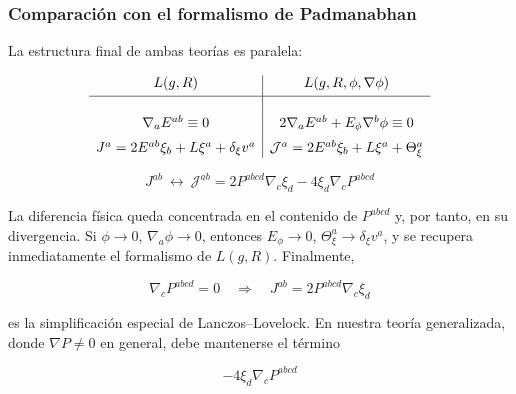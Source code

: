 \documentclass{beamer}
\newcommand{\DenseDisplaySpacing}{%
\setlength{\abovedisplayskip}{1pt}%
\setlength{\belowdisplayskip}{1pt}%
\setlength{\abovedisplayshortskip}{0pt}%
\setlength{\belowdisplayshortskip}{0pt}%
\setlength{\jot}{1pt}%
}
\begin{document}
\begin{frame}[label=nav-frame-086]
	\frametitle{Comparación con el formalismo de Padmanabhan}
	\small
\linespread{.94}\selectfont\DenseDisplaySpacing

	La estructura final de ambas teorías es paralela:

	\[
	\begin{array}{c|c}
		L(g,R)
		&
		L(g,R,\phi,\nabla\phi)
		\\[1mm]
		\hline
		\\[0.5mm]
		\nabla_aE^{ab}\equiv0
		&
		2\nabla_aE^{ab}+E_\phi\nabla^b\phi\equiv0
		\\[2mm]
		J^a=
		2E^{ab}\xi_b+L\xi^a+\delta_\xi v^a
		&
		\mathcal J^a=
		2E^{ab}\xi_b+L\xi^a+\Theta_\xi^a
	\end{array}
	\]

	\begin{equation*}
		J^{ab}
		\ \longleftrightarrow\
		\mathcal J^{ab}
		=
		2P^{abcd}\nabla_c\xi_d
		-
		4\xi_d\nabla_cP^{abcd}
	\end{equation*}

	La diferencia física queda concentrada en el contenido de
	\(P^{abcd}\) y, por tanto, en su divergencia. Si $\phi\rightarrow0$, $\nabla_a\phi\rightarrow0$, entonces $E_\phi\rightarrow0$, $\Theta_\xi^a\rightarrow\delta_\xi v^a$, y se recupera inmediatamente el formalismo de \(L(g,R)\). Finalmente,

	\[
	\boxed{
		\nabla_cP^{abcd}=0
		\quad\Longrightarrow\quad
		J^{ab}=2P^{abcd}\nabla_c\xi_d
	}
	\]

	es la simplificación especial de Lanczos--Lovelock. En nuestra
	teoría generalizada, donde \(\nabla P\neq0\) en general, debe
	mantenerse el término

	\[
	\boxed{
		-4\xi_d\nabla_cP^{abcd}
	}
	\]

\end{frame}
\end{document}

